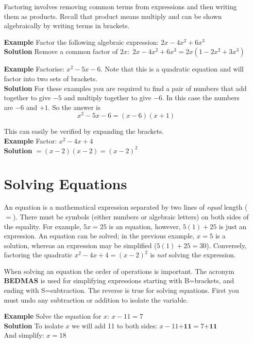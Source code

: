 Factoring involves removing common terms from expressions and then writing them as products. Recall that product means multiply and can be shown algebraically by writing terms in brackets. 

\textbf{Example} Factor the following algebraic expression: $2x-4x^2+6x^3$\\
\textbf{Solution} Remove a common factor of $2x$: $\,2x-4x^2+6x^3=2x(1-2x^2+3x^3)$

\textbf{Example}
Factorise: $x^{2} -5 x -6$. Note that this is a quadratic equation and will factor into two sets of brackets.\\
\textbf{Solution} For these examples you are required to find a pair of numbers that add together to give $ -5$ and multiply together to give $ -6$. In this case the numbers are $ -6$ and $ +1$. So the answer is
\begin{equation*}x^{2} -5 x -6 =\left (x -6\right ) \left (x +1\right )
\end{equation*}

This can easily be verified by expanding the brackets.\\

\textbf{Example} Factor: $x^2-4x+4$\\
\textbf{Solution} $=(x-2)(x-2)=(x-2)^2$

\section*{Solving Equations}
An equation is a mathematical expression separated by two lines of \textit{equal} length ($=$). There must be symbols (either numbers or algebraic letters) on both sides of the equality. For example, $5x=25$ is an equation, however, $5(1)+25$ is just an expression. An equation can be solved; in the previous example, $x=5$ is a solution, whereas an expression may be simplified ($5(1)+25=30$). Conversely, factoring the quadratic $x^2-4x+4=(x-2)^2$ is \textit{not} solving the expression.

When solving an equation the order of operations is important. The acronym \textbf{BEDMAS} is used for simplifying expressions starting with B=brackets, and ending with S=subtraction. The reverse is true for solving equations. First you must undo any subtraction or addition to isolate the variable.

\textbf{Example} Solve the equation for $x$: $x-11=7$\\
\textbf{Solution} To isolate $x$ we will add 11 to both sides: $x-11\textbf{+11}=7\textbf{+11}$\\
And simplify: $x=18$

